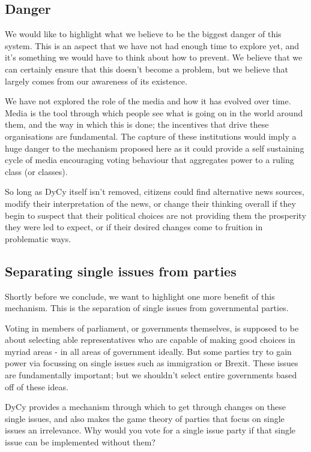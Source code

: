 \documentclass[twoside]{article}
\theoremstyle{definition}
\begin{document}
\subsection{Danger}

We would like to highlight what we believe to be the biggest danger of this system. This is an aspect that we have not had enough time to explore yet, and it’s something we would have to think about how to prevent. We believe that we can certainly ensure that this doesn’t become a problem, but we believe that largely comes from our awareness of its existence.

We have not explored the role of the media and how it has evolved over time. Media is the tool through which people see what is going on in the world around them, and the way in which this is done; the incentives that drive these organisations are fundamental. The capture of these institutions would imply a huge danger to the mechanism proposed here as it could provide a self sustaining cycle of media encouraging voting behaviour that aggregates power to a ruling class (or classes).

So long as DyCy itself isn’t removed, citizens could find alternative news sources, modify their interpretation of the news, or change their thinking overall if they begin to suspect that their political choices are not providing them the prosperity they were led to expect, or if their desired changes come to fruition in problematic ways.

\subsection{Separating single issues from parties}

Shortly before we conclude, we want to highlight one more benefit of this mechanism. This is the separation of single issues from governmental parties.

Voting in members of parliament, or governments themselves, is supposed to be about selecting able representatives who are capable of making good choices in myriad areas - in all areas of government ideally. But some parties try to gain power via focussing on single issues such as immigration or Brexit. These issues are fundamentally important; but we shouldn’t select entire governments based off of these ideas.

DyCy provides a mechanism through which to get through changes on these single issues, and also makes the game theory of parties that focus on single issues an irrelevance. Why would you vote for a single issue party if that single issue can be implemented without them?
\end{document}
